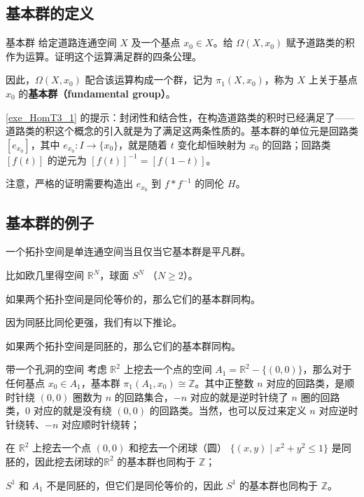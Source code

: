 \subsection{基本群的定义}

\begin{exercise}{基本群}\label{exe_HomT3_1}
给定道路连通空间 $X$ 及一个基点 $x_0\in X$。给 $\Omega(X, x_0)$ 赋予道路类的积作为运算。证明这个运算满足群的四条公理。

因此，$\Omega(X, x_0)$ 配合该运算构成一个群，记为 $\pi_1(X, x_0)$，称为 $X$ 上关于基点 $x_0$ 的\textbf{基本群（fundamental group）}。
\end{exercise}

\autoref{exe_HomT3_1} 的提示：封闭性和结合性，在构造道路类的积时已经满足了——道路类的积这个概念的引入就是为了满足这两条性质的。基本群的单位元是回路类 $[e_{x_0}]$，其中 $e_{x_0}: I\rightarrow\{x_0\}$，就是随着 $t$ 变化却恒映射为 $x_0$ 的回路；回路类 $[f(t)]$ 的逆元为 $[f(t)]^{-1}=[f(1-t)]$。

注意，严格的证明需要构造出 $e_{x_0}$ 到 $f*f^{-1}$ 的同伦 $H$。

\subsection{基本群的例子}

\begin{theorem}{}
一个拓扑空间是单连通空间当且仅当它基本群是平凡群。
\end{theorem}

比如欧几里得空间 $\mathbb{R}^N$，球面 $S^N$ （$N \geq 2$）。

\begin{theorem}{}
如果两个拓扑空间是同伦等价的，那么它们的基本群同构。
\end{theorem}

因为同胚比同伦更强，我们有以下推论。
\begin{corollary}{}
如果两个拓扑空间是同胚的，那么它们的基本群同构。
\end{corollary}

\begin{example}{带一个孔洞的空间}
考虑 $\mathbb{R}^2$ 上挖去一个点的空间 $A_1=\mathbb{R}^2-\{(0,0)\}$，那么对于任何基点 $x_0\in A_1$，基本群 $\pi_1(A_1, x_0) \cong \mathbb{Z}$。其中正整数 $n$ 对应的回路类，是顺时针绕 $(0,0)$ 圈数为 $n$ 的回路集合，$-n$ 对应的就是逆时针绕了 $n$ 圈的回路类，$0$ 对应的就是没有绕 $(0,0)$ 的回路类。当然，也可以反过来定义 $n$ 对应逆时针绕转、$-n$ 对应顺时针绕转；

在 $\mathbb{R}^2$ 上挖去一个点 $(0, 0)$ 和挖去一个闭球（圆） $\{(x, y) \mid  x^2 + y^2 \leq 1\}$ 是同胚的，因此挖去闭球的$\mathbb{R}^2$ 的基本群也同构于 $\mathbb{Z}$；

$S^1$ 和 $A_1$ 不是同胚的，但它们是同伦等价的，因此 $S^1$ 的基本群也同构于 $\mathbb{Z}$。
\end{example}

